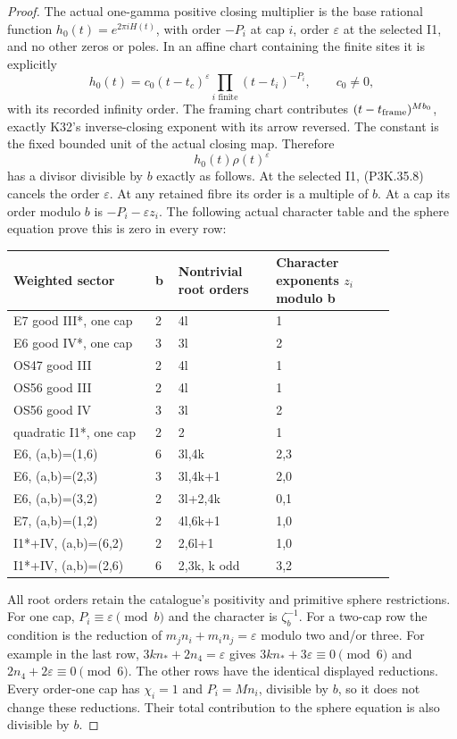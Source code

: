 \begin{proof}
The actual one-gamma positive closing multiplier is the base
rational function \(h_0(t)=e^{2\pi iH(t)}\), with order
\(-P_i\) at cap \(i\), order \(\varepsilon\) at the
selected I1, and no other zeros or poles.
In an affine chart containing the finite sites it is explicitly
\[
 h_0(t)=c_0(t-t_c)^\varepsilon
                   \prod_{i\text{ finite}}(t-t_i)^{-P_i},
 \qquad c_0\ne0,
\]
with its recorded infinity order. The framing chart contributes
\((t-t_{\rm frame})^{Mb_0}\), exactly K32's inverse-closing
exponent with its arrow reversed. The constant is the fixed
bounded unit of the actual closing map. Therefore
\[
                h_0(t)\rho(t)^\varepsilon
\]
has a divisor divisible by \(b\) exactly as follows. At the
selected I1, (P3K.35.8) cancels the order \(\varepsilon\).
At any retained fibre its order is a multiple of \(b\).
At a cap its order modulo \(b\) is
\(-P_i-\varepsilon z_i\). The following actual character
table and the sphere equation prove this is zero in every row:

\begin{center}\small\begin{tabular}{p{0.32\linewidth}p{0.04\linewidth}p{0.22\linewidth}p{0.27\linewidth}}\toprule
Weighted sector & b & Nontrivial root orders & Character exponents \(z_i\) modulo b\\
\midrule
E7 good III*, one cap & 2 & 4l & 1\\
E6 good IV*, one cap & 3 & 3l & 2\\
OS47 good III & 2 & 4l & 1\\
OS56 good III & 2 & 4l & 1\\
OS56 good IV & 3 & 3l & 2\\
quadratic I1*, one cap & 2 & 2 & 1\\
E6, (a,b)=(1,6) & 6 & 3l,4k & 2,3\\
E6, (a,b)=(2,3) & 3 & 3l,4k+1 & 2,0\\
E6, (a,b)=(3,2) & 2 & 3l+2,4k & 0,1\\
E7, (a,b)=(1,2) & 2 & 4l,6k+1 & 1,0\\
I1*+IV, (a,b)=(6,2) & 2 & 2,6l+1 & 1,0\\
I1*+IV, (a,b)=(2,6) & 6 & 2,3k, k odd & 3,2\\
\bottomrule\end{tabular}\end{center}

All root orders retain the catalogue's positivity and primitive
sphere restrictions. For one cap, \(P_i\equiv\varepsilon\pmod b\)
and the character is \(\zeta_b^{-1}\). For a two-cap row
the condition is the reduction of
\(m_jn_i+m_in_j=\varepsilon\) modulo two and/or three.
For example in the last row, \(3kn_*+2n_4=\varepsilon\)
gives \(3kn_*+3\varepsilon\equiv0\pmod6\) and
\(2n_4+2\varepsilon\equiv0\pmod6\). The other rows have
the identical displayed reductions. Every order-one cap has
\(\chi_i=1\) and \(P_i=Mn_i\), divisible by \(b\), so it
does not change these reductions. Their total contribution to
the sphere equation is also divisible by \(b\).


\end{proof}
